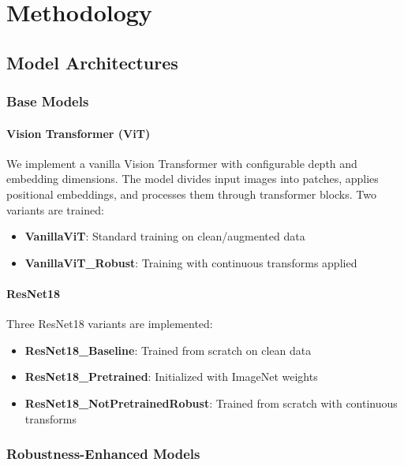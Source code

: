 \documentclass[11pt,a4paper]{article}
\begin{document}
\section{Methodology}

\subsection{Model Architectures}

\subsubsection{Base Models}

\paragraph{Vision Transformer (ViT)}
We implement a vanilla Vision Transformer with configurable depth and embedding dimensions. The model divides input images into patches, applies positional embeddings, and processes them through transformer blocks. Two variants are trained:
\begin{itemize}
    \item \textbf{VanillaViT}: Standard training on clean/augmented data
    \item \textbf{VanillaViT\_Robust}: Training with continuous transforms applied
\end{itemize}

\paragraph{ResNet18}
Three ResNet18 variants are implemented:
\begin{itemize}
    \item \textbf{ResNet18\_Baseline}: Trained from scratch on clean data
    \item \textbf{ResNet18\_Pretrained}: Initialized with ImageNet weights
    \item \textbf{ResNet18\_NotPretrainedRobust}: Trained from scratch with continuous transforms
\end{itemize}

\subsubsection{Robustness-Enhanced Models}
\end{document}
